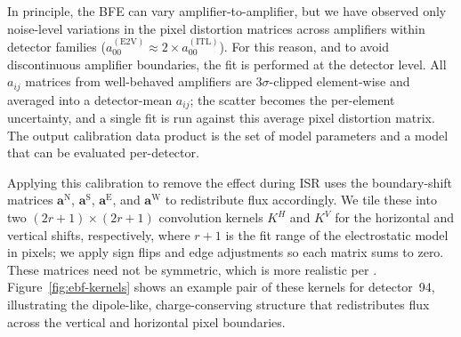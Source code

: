 In principle, the BFE can vary amplifier-to-amplifier, but we have observed only noise-level variations in the pixel distortion matrices across amplifiers within detector families ($a_{00}^{(\mathrm{E2V})} \approx 2 \times a_{00}^{(\mathrm{ITL})}$).
For this reason, and to avoid discontinuous amplifier boundaries, the fit is performed at the detector level.
All $a_{ij}$ matrices from well-behaved amplifiers are 3$\sigma$-clipped element-wise and averaged into a detector-mean $a_{ij}$; the scatter becomes the per-element uncertainty, and a single fit is run against this average pixel distortion matrix.
The output calibration data product is the set of model parameters and a model that can be evaluated per-detector.

Applying this calibration to remove the effect during ISR uses the boundary-shift matrices $\mathbf{a}^{\mathrm{N}}$, $\mathbf{a}^{\mathrm{S}}$, $\mathbf{a}^{\mathrm{E}}$, and $\mathbf{a}^{\mathrm{W}}$ to redistribute flux accordingly.
We tile these into two $(2r+1)\times(2r+1)$ convolution kernels $K^{H}$ and $K^{V}$ for the horizontal and vertical shifts, respectively, where $r+1$ is the fit range of the electrostatic model in pixels; we apply sign flips and edge adjustments so each matrix sums to zero.
These matrices need not be symmetric, which is more realistic per \citet{2024PASP..136d5003B}.
Figure~\ref{fig:ebf-kernels} shows an example pair of these kernels for detector~94, illustrating the dipole-like, charge-conserving structure that redistributes flux across the vertical and horizontal pixel boundaries.


